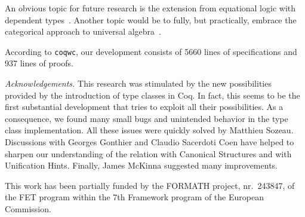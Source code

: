 \documentclass[a4paper,10pt,runningheads]{llncs}
\begin{document}
An obvious topic for future research is the extension from equational logic with dependent types~\cite{Cartmell,palmgren2007partial}. Another topic would be to fully, but practically, embrace the
categorical approach to universal algebra~\cite{pitts2001categorical}.

According to \lstinline|coqwc|, our development consists of 5660 lines of specifications and 937 lines of proofs.

\emph{Acknowledgements.}
This research was stimulated by the new possibilities provided by the introduction of type classes
in Coq. In fact, this seems to be the first substantial development that tries to exploit all their
possibilities. As a consequence, we found many small bugs and unintended behavior in the type
class implementation. All these issues were quickly solved by Matthieu Sozeau. Discussions with
Georges Gonthier and Claudio Sacerdoti Coen have helped to
sharpen our understanding of the relation with Canonical Structures and with Unification Hints. Finally, James McKinna suggested many improvements.


This work has been partially funded by the FORMATH project, nr.\ 243847, of the FET program within the 7th Framework program of the European Commission.


\end{document}

